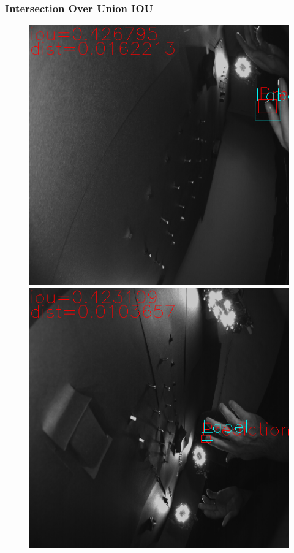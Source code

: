\subsubsection{Intersection Over Union IOU}
\begin{figure}
	\centering
	\begin{minipage}[b]{0.48\textwidth}	
		\includegraphics[width=\textwidth]{Kapitel/70Resultate/Bilder/7iouKnappGut.png}
	\end{minipage}
	\hfill
	\begin{minipage}[b]{0.48\textwidth}		
		\includegraphics[width=\textwidth]{Kapitel/70Resultate/Bilder/8iouKnappGut.png}

\end{minipage}
\end{figure}
